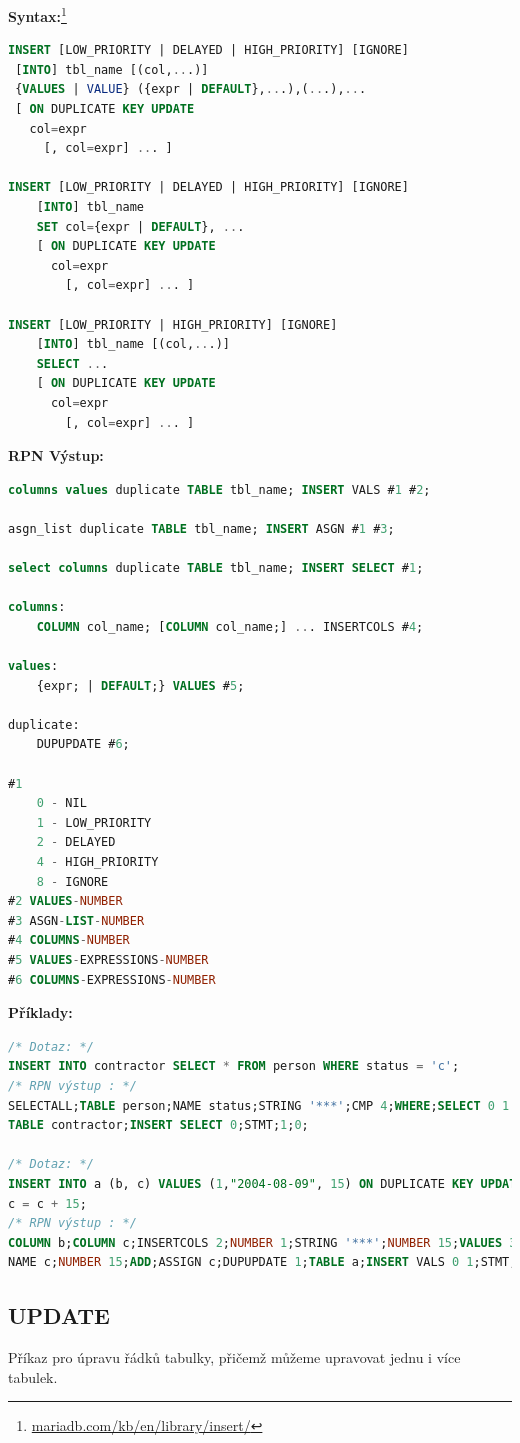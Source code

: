 \textbf{Syntax:}\footnote{\url{mariadb.com/kb/en/library/insert/}}
\begin{lstlisting}[language=sql]
INSERT [LOW_PRIORITY | DELAYED | HIGH_PRIORITY] [IGNORE]
 [INTO] tbl_name [(col,...)]
 {VALUES | VALUE} ({expr | DEFAULT},...),(...),...
 [ ON DUPLICATE KEY UPDATE
   col=expr
     [, col=expr] ... ]

INSERT [LOW_PRIORITY | DELAYED | HIGH_PRIORITY] [IGNORE]
    [INTO] tbl_name 
    SET col={expr | DEFAULT}, ...
    [ ON DUPLICATE KEY UPDATE
      col=expr
        [, col=expr] ... ]

INSERT [LOW_PRIORITY | HIGH_PRIORITY] [IGNORE]
    [INTO] tbl_name [(col,...)]
    SELECT ...
    [ ON DUPLICATE KEY UPDATE
      col=expr
        [, col=expr] ... ]
\end{lstlisting}
\vspace*{\baselineskip}
\textbf{RPN Výstup:}
\begin{lstlisting}[language=sql]
columns values duplicate TABLE tbl_name; INSERT VALS #1 #2;

asgn_list duplicate TABLE tbl_name; INSERT ASGN #1 #3;

select columns duplicate TABLE tbl_name; INSERT SELECT #1;

columns:
    COLUMN col_name; [COLUMN col_name;] ... INSERTCOLS #4;

values:
    {expr; | DEFAULT;} VALUES #5;

duplicate:
    DUPUPDATE #6;

#1
    0 - NIL
    1 - LOW_PRIORITY 
    2 - DELAYED
    4 - HIGH_PRIORITY
    8 - IGNORE
#2 VALUES-NUMBER
#3 ASGN-LIST-NUMBER
#4 COLUMNS-NUMBER
#5 VALUES-EXPRESSIONS-NUMBER
#6 COLUMNS-EXPRESSIONS-NUMBER
\end{lstlisting}
\newpage
\textbf{Příklady:}
\begin{lstlisting}[language=sql]
/* Dotaz: */
INSERT INTO contractor SELECT * FROM person WHERE status = 'c';
/* RPN výstup : */
SELECTALL;TABLE person;NAME status;STRING '***';CMP 4;WHERE;SELECT 0 1 1;
TABLE contractor;INSERT SELECT 0;STMT;1;0;

/* Dotaz: */
INSERT INTO a (b, c) VALUES (1,"2004-08-09", 15) ON DUPLICATE KEY UPDATE 
c = c + 15;
/* RPN výstup : */
COLUMN b;COLUMN c;INSERTCOLS 2;NUMBER 1;STRING '***';NUMBER 15;VALUES 3;
NAME c;NUMBER 15;ADD;ASSIGN c;DUPUPDATE 1;TABLE a;INSERT VALS 0 1;STMT;1;0;
\end{lstlisting}

\subsection{UPDATE} \label{subsec:6:update}
Příkaz pro úpravu řádků tabulky, přičemž můžeme upravovat jednu i více tabulek. \\

